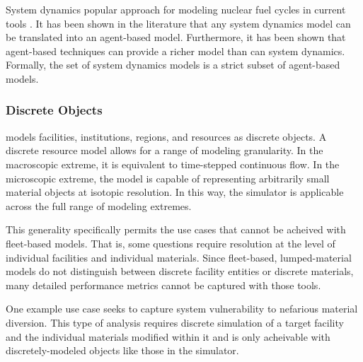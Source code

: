 System dynamics popular approach for modeling nuclear fuel cycles in current
tools \cite{VISION,CAFCA}. It has been shown in the literature
\cite{macal_agent-based_2010} that any system dynamics model can be translated
into an agent-based model. Furthermore, it has been shown that agent-based
techniques can provide a richer model than can system dynamics. Formally, the
set of system dynamics models is a strict subset of agent-based models.

\subsubsection{Discrete Objects}

\Cyclus models facilities, institutions, regions, and resources as discrete 
objects. A discrete resource model allows for a range of modeling granularity. In the
macroscopic extreme, it is equivalent to time-stepped continuous flow. In the
microscopic extreme, the model is capable of representing arbitrarily small 
material objects at isotopic resolution. In this way, the \Cyclus simulator is 
applicable across the full range of modeling extremes. 

This generality specifically permits the use cases that cannot be acheived with 
fleet-based models. That is, some questions require resolution at the level of 
individual facilities and individual materials.  Since fleet-based, 
lumped-material models do not distinguish between discrete facility entities or 
discrete materials, many detailed performance metrics cannot be captured with 
those tools. 

One example use case seeks to capture system vulnerability to nefarious 
material diversion. This type of analysis requires discrete simulation of a 
target facility and the individual materials modified within it and is only 
acheivable with discretely-modeled objects like those in the \Cyclus simulator. 

